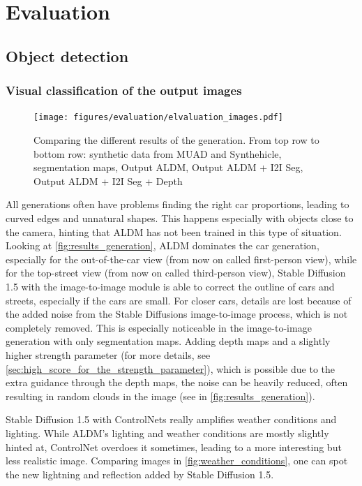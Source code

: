\chapter{Evaluation}
\label{ch:evaluation}

\section{Object detection}

\subsection{Visual classification of the output images}
\label{sec:looking_at_the_output_images}

\begin{figure}[H]
  \centering
  \texttt{[image: figures/evaluation/elvaluation\_images.pdf]}
  \caption{Comparing the different results of the generation. From top row to bottom row: synthetic data from MUAD and Synthehicle, segmentation maps, Output ALDM, Output ALDM + I2I Seg, Output ALDM + I2I Seg + Depth}
  \label{fig:results_generation}
  \clearpage
\end{figure}

All generations often have problems finding the right car proportions, leading to curved edges and unnatural shapes. This happens especially with objects close to the camera, hinting that ALDM has not been trained in this type of situation. Looking at \autoref{fig:results_generation}, ALDM dominates the car generation, especially for the out-of-the-car view (from now on called first-person view), while for the top-street view (from now on called third-person view), Stable Diffusion 1.5 with the image-to-image module is able to correct the outline of cars and streets, especially if the cars are small. For closer cars,
details are lost because of the added noise from the Stable Diffusions image-to-image process, which is not completely removed. This is especially noticeable in the image-to-image generation with only segmentation maps. Adding depth maps and a slightly higher strength parameter (for more details, see \autoref{sec:high_score_for_the_strength_parameter}), which is possible due to the extra guidance through the depth maps, the noise can be heavily reduced, often resulting in random clouds in the image (see in \autoref{fig:results_generation}).

Stable Diffusion 1.5 with ControlNets really amplifies weather conditions and lighting. While ALDM's lighting and weather conditions are mostly slightly hinted at, ControlNet overdoes it sometimes, leading to a more interesting but less realistic image. Comparing images in \autoref{fig:weather_conditions}, one can spot the new lightning and reflection added by Stable Diffusion 1.5.

